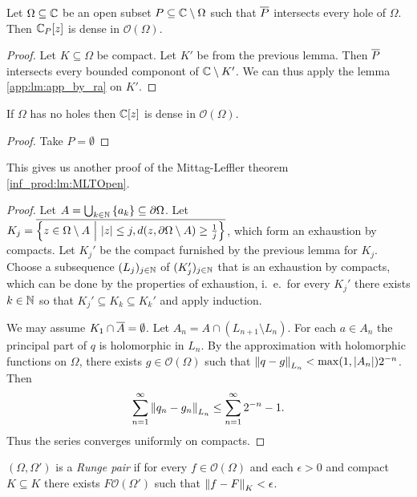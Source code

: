 \begin{izrek}
    Let $\Omega \subseteq \mathbb{C}$ be an open subset $P \subseteq \mathbb{C} \setminus \Omega$ such that $\overline{P}$ intersects every hole of $\Omega$. Then $\mathbb{C}_P[z]$ is dense in $\mathcal{O}(\Omega)$.
\end{izrek}
\begin{proof}
    Let $K \subseteq \Omega$ be compact. Let $K'$ be from the previous lemma. Then $\overline{P}$ intersects every bounded componont of $\mathbb{C} \setminus K'$. We can thus apply the lemma \ref{app:lm:app_by_ra} on $K'$. 
\end{proof}
\begin{posledica}
    If $\Omega$ has no holes then $\mathbb{C}[z]$ is dense in $\mathcal{O}(\Omega)$.
\end{posledica}
\begin{proof}
    Take $P = \emptyset$
\end{proof}

\begin{opomba}
    This gives us another proof of the Mittag-Leffler theorem \ref{inf_prod:lm:MLTOpen}.
\end{opomba}
\begin{proof}
    Let $A = \bigcup_{k \in \mathbb{N}} \left\{a_k\right\} \subseteq \partial{\Omega}$. Let $K_j = \overline{\left\{z \in \Omega \setminus A~\middle\vert~\left\lvert z\right\rvert \leq j, d(z, \partial{\Omega  \setminus A}) \geq \frac{1}{j}\right\}}$, which form an exhaustion by compacts. Let $K_j'$ be the compact furnished by the previous lemma for $K_j$. Choose a subsequence $(L_j)_{j \in \mathbb{N}}$ of $(K_j')_{j \in \mathbb{N}}$ that is an exhaustion by compacts, which can be done by the properties of exhaustion, i.\ e.\ for every $K_j'$ there exists $k \in \mathbb{N}$ so that $K_j' \subseteq K_k \subseteq K_k'$ and apply induction.

    We may assume $K_1 \cap \overline{A} = \emptyset$. Let $A_n = A \cap (L_{n + 1} \setminus L_n)$. For each $a \in A_n$ the principal part of $q$ is holomorphic in $L_n$. By the approximation with holomorphic functions on $\Omega$, there exists $g \in \mathcal{O}(\Omega)$ such that $\left\lVert q - g\right\rVert_{L_n} < \max(1, \left\lvert A_n\right\rvert) 2^{- n}$. Then
    \[
        \sum_{n = 1}^{\infty} \left\lVert q_n - g_n\right\rVert_{L_n} \leq \sum_{n = 1}^{\infty} 2^{ - n} - 1.
    \]
    Thus the series converges uniformly on compacts.
\end{proof}

\begin{definicija}
    $(\Omega, \Omega')$ is a \emph{Runge pair} if for every $f \in \mathcal{O}(\Omega)$ and each $\epsilon > 0$ and compact $K \subseteq K$ there exists $F \mathcal{O}(\Omega')$ such that $\left\lVert f - F\right\rVert_K < \epsilon$.
\end{definicija}

